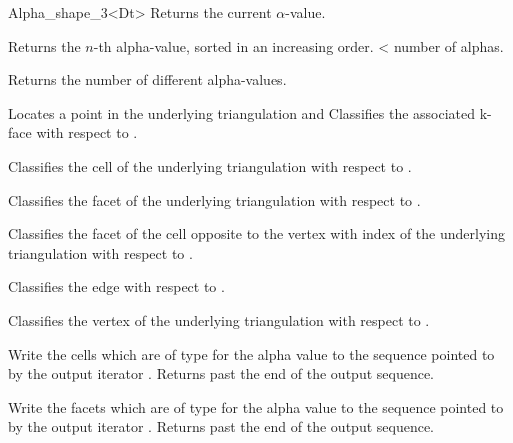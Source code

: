 \begin{ccRefClass} {Alpha_shape_3<Dt>}
{Returns the current $\alpha$-value.}

{Returns the $n$-th alpha-value, sorted in an increasing order.
 \ccPrecond {} < number of alphas.}

{Returns the number of different alpha-values.}

{Locates a point   in the underlying triangulation and Classifies the 
associated k-face with respect to .}

{Classifies the cell  of the underlying triangulation with
respect 
to .}

{Classifies the facet  of the underlying triangulation with
respect to .}

{Classifies the facet of the cell  opposite to the vertex with index
of the underlying triangulation with respect to .}

{Classifies the edge  with respect to  . }

{Classifies the vertex  of the underlying triangulation with respect to .}

{Write the cells which are of type  for 
the alpha value  to the sequence
pointed to by the output iterator . Returns past the end
of the output sequence.}


{Write the facets which are of type  for 
the alpha value  to the sequence
pointed to by the output iterator . Returns past the end
of the output sequence.}


\end{ccRefClass}
